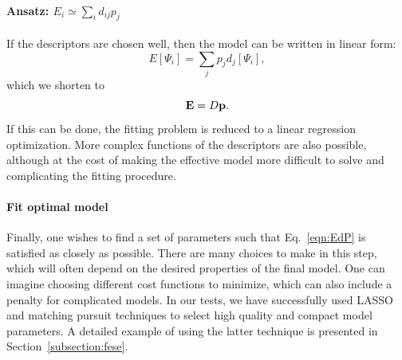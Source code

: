 \documentclass[aps, prb, 11pt]{revtex4-1}
\begin{document}
\paragraph{Ansatz: $E_i \simeq \sum_i  d_{ij} p_j$} 
If the descriptors are chosen well, then the model can be written in linear form:
\begin{equation}
E[\Psi_i] = \sum_j p_j d_j[\Psi_i],	
\end{equation}
which we shorten to 
\begin{equation}
{\bf E} = D{\bf p} .
\label{eqn:EdP}
\end{equation}
If this can be done, the fitting problem is reduced to a linear regression optimization.
More complex functions of the descriptors are also possible, although at the cost of making the effective model more difficult to solve and complicating the fitting procedure.


\paragraph{Fit optimal model}
Finally, one wishes to find a set of parameters such that Eq.~\eqref{eqn:EdP} is satisfied as closely as possible. 
There are many choices to make in this step, which will often depend on the desired properties of the final model. 
One can imagine choosing different cost functions to minimize, which can also include a penalty for complicated models. 
In our tests, we have successfully used LASSO \cite{Lasso} and matching pursuit techniques \cite{MP_Zhang1993} to select high quality and compact model parameters. 
A detailed example of using the latter technique is presented in Section~\ref{subsection:fese}.
\end{document}
